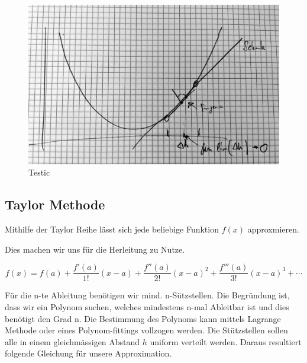 \begin{figure}
	\begin{center}
		\includegraphics[width=12cm]{papers/ableitung/images/sekante_bsp.jpg}
		\caption{Testic}
		\label{ableitung:fig:ableitung_bsp}
	\end{center}
\end{figure}





\subsection{Taylor Methode}

Mithilfe der Taylor Reihe lässt sich jede beliebige Funktion $f(x)$ approxmieren. 

Dies machen wir uns für die Herleitung zu Nutze.

\begin{equation}
f(x) = f(a)+{\frac {f'(a)}{1!}}(x-a)+{\frac {f''(a)}{2!}}(x-a)^{2}+{\frac {f'''(a)}{3!}}(x-a)^{3}+\cdots
\label{ableitung:eqn:taylorseries}
\end{equation}

Für die n-te Ableitung benötigen wir mind. n-Sützstellen.
Die Begründung ist, dass wir ein Polynom suchen, welches mindestens n-mal Ableitbar ist und dies benötigt den Grad n. Die Bestimmung des Polynoms kann mittels Lagrange Methode oder eines Polynom-fittings vollzogen werden.
Die Stützstellen sollen alle in einem gleichmässigen Abstand $h$ uniform verteilt werden.
Daraus resultiert folgende Gleichung für unsere Approximation.

